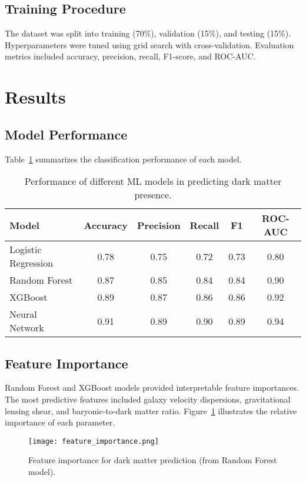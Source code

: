 \documentclass[12pt]{article}
\begin{document}
\subsection{Training Procedure}
The dataset was split into training (70\%), validation (15\%), and testing (15\%). Hyperparameters were tuned using grid search with cross-validation. Evaluation metrics included accuracy, precision, recall, F1-score, and ROC-AUC.

\section{Results}
\subsection{Model Performance}
Table~\ref{tab:results} summarizes the classification performance of each model.

\begin{table}[h!]
\centering
\begin{tabular}{l|c|c|c|c|c}
Model & Accuracy & Precision & Recall & F1 & ROC-AUC \\
\hline
Logistic Regression & 0.78 & 0.75 & 0.72 & 0.73 & 0.80 \\
Random Forest & 0.87 & 0.85 & 0.84 & 0.84 & 0.90 \\
XGBoost & 0.89 & 0.87 & 0.86 & 0.86 & 0.92 \\
Neural Network & 0.91 & 0.89 & 0.90 & 0.89 & 0.94 \\
\end{tabular}
\caption{Performance of different ML models in predicting dark matter presence.}
\label{tab:results}
\end{table}

\subsection{Feature Importance}
Random Forest and XGBoost models provided interpretable feature importances. The most predictive features included galaxy velocity dispersions, gravitational lensing shear, and baryonic-to-dark matter ratio. Figure~\ref{fig:featureimportance} illustrates the relative importance of each parameter.

\begin{figure}[h!]
\centering
\texttt{[image: feature\_importance.png]}
\caption{Feature importance for dark matter prediction (from Random Forest model).}
\label{fig:featureimportance}
\end{figure}
\end{document}

